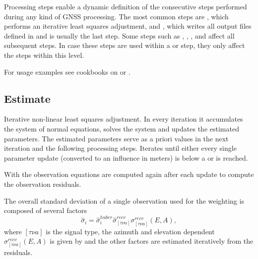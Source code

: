 Processing steps enable a dynamic definition of the consecutive steps performed during any kind of GNSS processing.
The most common steps are , which performs an iterative least
squares adjustment, and , which writes all output files
defined in  and is usually the last step.
Some steps such as ,
,
, and
 affect all subsequent steps.
In case these steps are used within a  or
 step,
they only affect the steps within this level.

For usage examples see cookbooks on 
or .


\subsection{Estimate}\label{gnssProcessingStepType:estimate}
Iterative non-linear least squares adjustment.
In every iteration it accumulates the system of normal equations, solves the system and updates the estimated parameters.
The estimated parameters serve as a priori values in the next iteration and the following processing steps.
Iterates until either every single parameter update (converted to an influence in meters)
is below a  or  is reached.

With  the observation equations are computed
again after each update to compute the observation residuals.

The overall standard deviation of a single observation used for the weighting
is composed of several factors
\begin{equation}
  \hat{\sigma}_i = \hat{\sigma}_i^{huber} \hat{\sigma}_{[\tau\nu a]}^{recv} \sigma_{[\tau\nu a]}^{recv}(E,A),
\end{equation}
where $[\tau\nu a]$ is the signal type, the azimuth and elevation dependent $\sigma_{[\tau\nu a]}^{recv}(E,A)$ is given by
 and the other factors are
estimated iteratively from the residuals.

